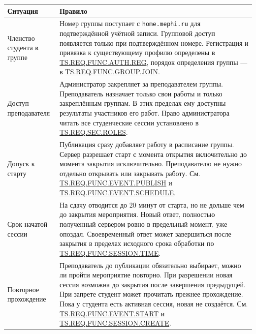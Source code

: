 \documentclass[12pt,a4paper]{article}
\begin{document}
{\def\LTcaptype{none} %
\begin{longtable}[]{@{}
  >{\raggedright\arraybackslash}p{}
  >{\raggedright\arraybackslash}p{}@{}}
\toprule\noalign{}
\begin{minipage}[b]{\linewidth}\raggedright
Ситуация
\end{minipage} & \begin{minipage}[b]{\linewidth}\raggedright
Правило
\end{minipage} \\
\midrule\noalign{}
\endhead
\bottomrule\noalign{}
\endlastfoot
Членство студента в группе & Номер группы поступает с \texttt{home.\allowbreak{}mephi.\allowbreak{}ru} для подтверждённой учётной записи. Групповой доступ появляется только при подтверждённом номере. Регистрация и привязка к существующему профилю определены в {\hyperlink{ts-req-func-auth-reg}{TS.REQ.FUNC.AUTH.REG}}, порядок определения группы --- в {\hyperlink{ts-req-func-group-join}{TS.REQ.FUNC.GROUP.JOIN}}. \\
Доступ преподавателя & Администратор закрепляет за преподавателем группы. Преподаватель назначает только свои работы и только закреплённым группам. В этих пределах ему доступны результаты участников его работ. Право администратора читать все студенческие сессии установлено в {\hyperlink{ts-req-sec-roles}{TS.REQ.SEC.ROLES}}. \\
Допуск к старту & Публикация сразу добавляет работу в расписание группы. Сервер разрешает старт с момента открытия включительно до момента закрытия исключительно. Преподавателю не нужно отдельно открывать или закрывать работу. См. {\hyperlink{ts-req-func-event-publish}{TS.REQ.FUNC.EVENT.PUBLISH}} и {\hyperlink{ts-req-func-event-schedule}{TS.REQ.FUNC.EVENT.SCHEDULE}}. \\
Срок начатой сессии & На сдачу отводится до 20 минут от старта, но не дольше чем до закрытия мероприятия. Новый ответ, полностью полученный сервером ровно в предельный момент, уже опоздал. Своевременный ответ может завершиться после закрытия в пределах исходного срока обработки по {\hyperlink{ts-req-func-session-time}{TS.REQ.FUNC.SESSION.TIME}}. \\
Повторное прохождение & Преподаватель до публикации обязательно выбирает, можно ли пройти мероприятие повторно. При разрешении новая сессия возможна до закрытия после завершения предыдущей. При запрете студент может прочитать прежнее прохождение. Пока у студента есть активная сессия, новая не создаётся. См. {\hyperlink{ts-req-func-event-start}{TS.REQ.FUNC.EVENT.START}} и {\hyperlink{ts-req-func-session-create}{TS.REQ.FUNC.SESSION.CREATE}}. \\
\end{longtable}
}
\end{document}

